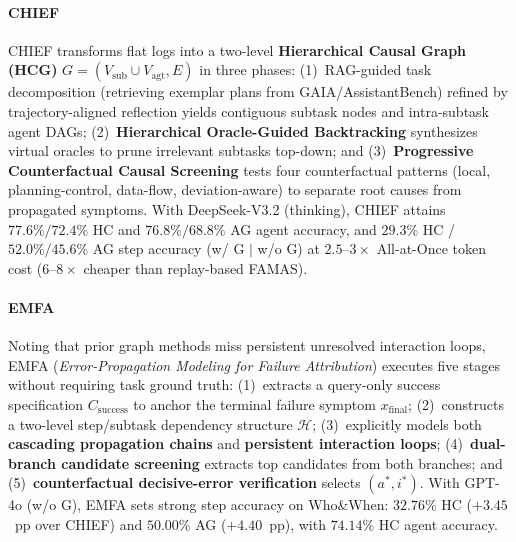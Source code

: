 \paragraph{CHIEF~\citep{wang2026chief}}
CHIEF transforms flat logs into a two-level \textbf{Hierarchical Causal Graph (HCG)} $G=(V_{\text{sub}}\cup V_{\text{agt}}, E)$ in three phases: (1)~RAG-guided task decomposition (retrieving exemplar plans from GAIA/AssistantBench) refined by trajectory-aligned reflection yields contiguous subtask nodes and intra-subtask agent DAGs; (2)~\textbf{Hierarchical Oracle-Guided Backtracking} synthesizes virtual oracles to prune irrelevant subtasks top-down; and (3)~\textbf{Progressive Counterfactual Causal Screening} tests four counterfactual patterns (local, planning-control, data-flow, deviation-aware) to separate root causes from propagated symptoms. With DeepSeek-V3.2 (thinking), CHIEF attains $77.6\%/72.4\%$ HC and $76.8\%/68.8\%$ AG agent accuracy, and $29.3\%$ HC / $52.0\%/45.6\%$ AG step accuracy (w/ G $\mid$ w/o G) at $2.5$--$3\times$ All-at-Once token cost ($6$--$8\times$ cheaper than replay-based FAMAS).

\paragraph{EMFA~\citep{liao2026emfa}}
Noting that prior graph methods miss persistent unresolved interaction loops, EMFA (\emph{Error-Propagation Modeling for Failure Attribution}) executes five stages without requiring task ground truth: (1)~extracts a query-only success specification $C_{\text{success}}$ to anchor the terminal failure symptom $x_{\text{final}}$; (2)~constructs a two-level step/subtask dependency structure $\mathcal{H}$; (3)~explicitly models both \textbf{cascading propagation chains} and \textbf{persistent interaction loops}; (4)~\textbf{dual-branch candidate screening} extracts top candidates from both branches; and (5)~\textbf{counterfactual decisive-error verification} selects $(a^*, i^*)$. With GPT-4o (w/o G), EMFA sets strong step accuracy on Who\&When: $32.76\%$ HC ($+3.45$~pp over CHIEF) and $50.00\%$ AG ($+4.40$~pp), with $74.14\%$ HC agent accuracy.

